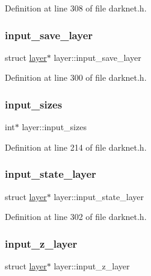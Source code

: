 Definition at line 308 of file darknet.\+h.

\mbox{\label{structlayer_a1dca5c6d106ae9a60fe70b7a9532cfc5}} 
\subsubsection{\texorpdfstring{input\_save\_layer}{input\_save\_layer}}
{\footnotesize\ttfamily struct \mbox{\hyperlink{structlayer}{layer}}$\ast$ layer\+::input\+\_\+save\+\_\+layer}



Definition at line 300 of file darknet.\+h.

\mbox{\label{structlayer_aef52d6a821c836ddd1b1993911c648f2}} 
\subsubsection{\texorpdfstring{input\_sizes}{input\_sizes}}
{\footnotesize\ttfamily int$\ast$ layer\+::input\+\_\+sizes}



Definition at line 214 of file darknet.\+h.

\mbox{\label{structlayer_a1f41820898325961a6acc16b113b90c7}} 
\subsubsection{\texorpdfstring{input\_state\_layer}{input\_state\_layer}}
{\footnotesize\ttfamily struct \mbox{\hyperlink{structlayer}{layer}}$\ast$ layer\+::input\+\_\+state\+\_\+layer}



Definition at line 302 of file darknet.\+h.

\mbox{\label{structlayer_addf22ace8c49b848e3f19122bdb703d5}} 
\subsubsection{\texorpdfstring{input\_z\_layer}{input\_z\_layer}}
{\footnotesize\ttfamily struct \mbox{\hyperlink{structlayer}{layer}}$\ast$ layer\+::input\+\_\+z\+\_\+layer}



